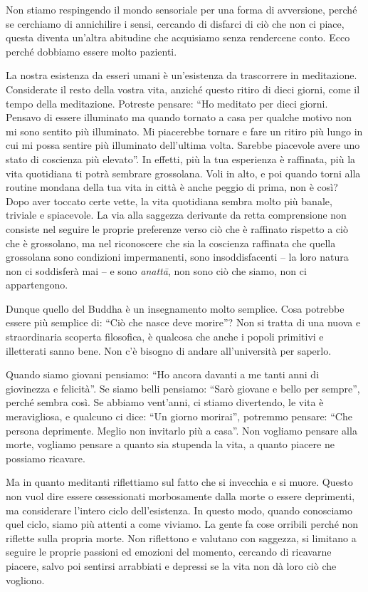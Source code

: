 Non stiamo respingendo il mondo sensoriale per una forma di avversione,
perché se cerchiamo di annichilire i sensi, cercando di disfarci di ciò
che non ci piace, questa diventa un'altra abitudine che acquisiamo senza
rendercene conto. Ecco perché dobbiamo essere molto pazienti.

La nostra esistenza da esseri umani è un'esistenza da trascorrere in
meditazione. Considerate il resto della vostra vita, anziché questo
ritiro di dieci giorni, come il tempo della meditazione. Potreste
pensare: ``Ho meditato per dieci giorni. Pensavo di essere illuminato ma
quando tornato a casa per qualche motivo non mi sono sentito più
illuminato. Mi piacerebbe tornare e fare un ritiro più lungo in cui mi
possa sentire più illuminato dell'ultima volta. Sarebbe piacevole avere
uno stato di coscienza più elevato''. In effetti, più la tua esperienza
è raffinata, più la vita quotidiana ti potrà sembrare grossolana. Voli
in alto, e poi quando torni alla routine mondana della tua vita in città
è anche peggio di prima, non è così? Dopo aver toccato certe vette, la
vita quotidiana sembra molto più banale, triviale e spiacevole. La via
alla saggezza derivante da retta comprensione non consiste nel seguire
le proprie preferenze verso ciò che è raffinato rispetto a ciò che è
grossolano, ma nel riconoscere che sia la coscienza raffinata che quella
grossolana sono condizioni impermanenti, sono insoddisfacenti -- la loro
natura non ci soddisferà mai -- e sono \emph{anattā}, non sono ciò che
siamo, non ci appartengono.

Dunque quello del Buddha è un insegnamento molto semplice. Cosa potrebbe
essere più semplice di: ``Ciò che nasce deve morire''? Non si tratta di
una nuova e straordinaria scoperta filosofica, è qualcosa che anche i
popoli primitivi e illetterati sanno bene. Non c'è bisogno di andare
all'università per saperlo.

Quando siamo giovani pensiamo: ``Ho ancora davanti a me tanti anni di
giovinezza e felicità''. Se siamo belli pensiamo: ``Sarò giovane e bello
per sempre'', perché sembra così. Se abbiamo vent'anni, ci stiamo
divertendo, le vita è meravigliosa, e qualcuno ci dice: ``Un giorno
morirai'', potremmo pensare: ``Che persona deprimente. Meglio non
invitarlo più a casa''. Non vogliamo pensare alla morte, vogliamo
pensare a quanto sia stupenda la vita, a quanto piacere ne possiamo
ricavare.

Ma in quanto meditanti riflettiamo sul fatto che si invecchia e si
muore. Questo non vuol dire essere ossessionati morbosamente dalla morte
o essere deprimenti, ma considerare l'intero ciclo dell'esistenza. In
questo modo, quando conosciamo quel ciclo, siamo più attenti a come
viviamo. La gente fa cose orribili perché non riflette sulla propria
morte. Non riflettono e valutano con saggezza, si limitano a seguire le
proprie passioni ed emozioni del momento, cercando di ricavarne piacere,
salvo poi sentirsi arrabbiati e depressi se la vita non dà loro ciò che
vogliono.

